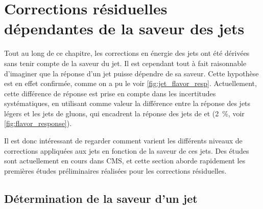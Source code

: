 \section{Corrections résiduelles dépendantes de la saveur des jets}

Tout au long de ce chapitre, les corrections en énergie des jets ont été dérivées sans tenir compte de la saveur du jet. Il est cependant tout à fait raisonnable d'imaginer que la réponse d'un jet puisse dépendre de sa saveur. Cette hypothèse est en effet confirmée, comme on a pu le voir \cref{fig:jet_flavor_resp}. Actuellement, cette différence de réponse est prise en compte dans les incertitudes systématiques, en utilisant comme valeur la différence entre la réponse des jets légers et les jets de gluons, qui encadrent la réponse des jets de \Pcharm et \Pbottom (\tilde\SI{2}{\percent}, voir \cref{fig:flavor_response}).

Il est donc intéressant de regarder comment varient les différents niveaux de corrections appliquées aux jets en fonction de la saveur de ces jets. Des études sont actuellement en cours dans CMS, et cette section aborde rapidement les premières études préliminaires réalisées pour les corrections résiduelles.

\subsection{Détermination de la saveur d'un jet}

